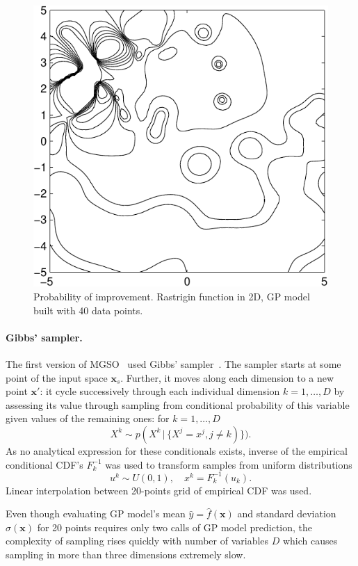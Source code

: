 \documentclass{itatnew}
\newcommand{\xx}{\mathrm{\mathbf{x}}}
\begin{document}
\begin{figure}
  \centering
  \includegraphics[width=0.6\linewidth]{poi_example}
  {\small
  \caption{Probability of improvement. Rastrigin function in 2D, GP model built with 40 data points.}
  }
  \label{fig:poi}
\end{figure}

\paragraph{Gibbs' sampler.}

The first version of MGSO~\cite{bajer_model_2013} used Gibbs' sampler~\cite{geman_stochastic_1984}. The sampler starts at some point of the input space $\xx_s$. Further, it moves along each dimension to a new point $\xx'$: it cycle successively through each individual dimension $k = 1,\ldots,D$ by assessing its value through sampling from conditional probability of this variable given values of the remaining ones: for $k=1,\ldots,D$
\begin{equation}
X^k \sim p(X^k \, | \, \{X^j = x^j, j \neq k)\}).
\end{equation}
As no analytical expression for these conditionals exists, inverse of the empirical conditional CDF's $F^{-1}_k$ was used to transform samples from uniform distributions
\begin{displaymath}
u^k \sim U(0,1), \quad  x^k = F^{-1}_k(u_k).
\end{displaymath}
Linear interpolation between 20-points grid of empirical CDF was used.

Even though evaluating GP model's mean $\hat{y} = \hat{f}(\xx)$ and standard deviation $\hat{\sigma}(\xx)$ for 20 points requires only two calls of GP model prediction, the complexity of sampling rises quickly with number of variables $D$ which causes sampling in more than three dimensions extremely slow.
\end{document}
